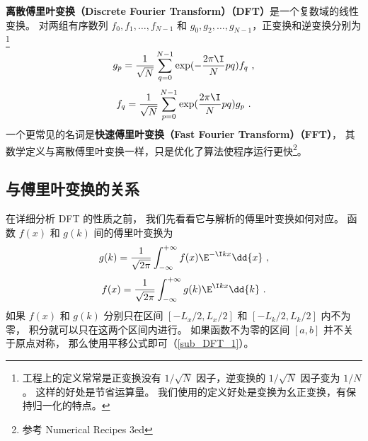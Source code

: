 
\textbf{离散傅里叶变换（Discrete Fourier Transform）（DFT）}是一个复数域的线性变换。 对两组有序数列 $f_0, f_1, \dots, f_{N-1}$ 和 $g_0,g_2,\dots, g_{N-1}$，正变换和逆变换分别为\footnote{工程上的定义常常是正变换没有 $1/\sqrt{N}$ 因子，逆变换的 $1/\sqrt{N}$ 因子变为 $1/N$。 这样的好处是节省运算量。 我们使用的定义好处是变换为幺正变换，有保持归一化的特点。}
\begin{equation}\label{eq_DFT_1}
g_p = \frac{1}{\sqrt{N}}\sum_{q=0}^{N-1} \exp(-\frac{2\pi\I}{N} p q ) f_q~,
\end{equation}
\begin{equation}\label{eq_DFT_2}
f_q = \frac{1}{\sqrt{N}}\sum_{p=0}^{N-1} \exp(\frac{2\pi\I}{N} p q) g_p~.
\end{equation}
一个更常见的名词是\textbf{快速傅里叶变换（Fast Fourier Transform）（FFT）}， 其数学定义与离散傅里叶变换一样，只是优化了算法使程序运行更快\footnote{参考 Numerical Recipes 3ed}。

\subsection{与傅里叶变换的关系}
在详细分析 DFT 的性质之前， 我们先看看它与解析的傅里叶变换如何对应。 函数 $f(x)$ 和 $g(k)$ 间的傅里叶变换为
\begin{equation}\label{eq_DFT_3}
g(k) = \frac{1}{\sqrt{2\pi}} \int_{-\infty}^{+\infty} f(x)\E^{-\I kx} \dd{x}~,
\end{equation}
\begin{equation}\label{eq_DFT_4}
f(x) = \frac{1}{\sqrt{2\pi}} \int_{-\infty}^{+\infty} g(k)\E^{\I kx} \dd{k}~.
\end{equation}
如果 $f(x)$ 和 $g(k)$ 分别只在区间 $[-L_x/2, L_x/2]$ 和 $[-L_k/2, L_k/2]$ 内不为零， 积分就可以只在这两个区间内进行。 如果函数不为零的区间 $[a,b]$ 并不关于原点对称， 那么使用平移公式即可（\autoref{sub_DFT_1}）。

